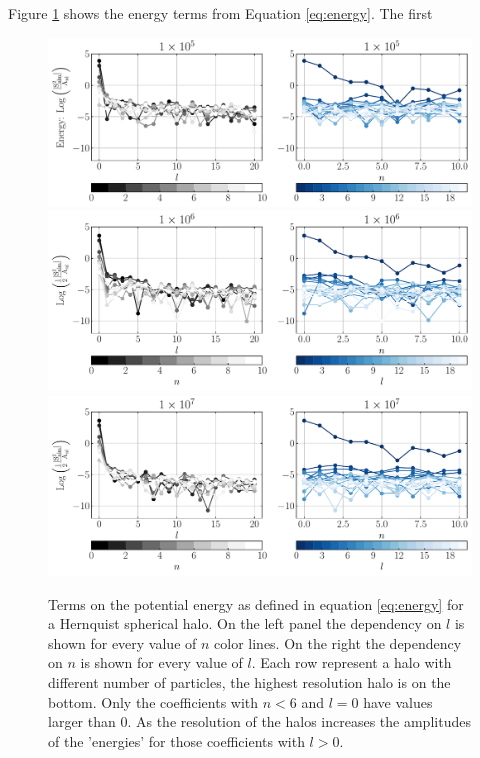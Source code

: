 \documentclass[14pt]{article}
\begin{document}
Figure \ref{fig:spherical_energy} shows the energy terms from Equation
\ref{eq:energy}. The first 

\begin{figure}[H]
  \centering
  \includegraphics[scale=0.5]{../code/energy_terms_hern_a_40_1E5.pdf}
  \includegraphics[scale=0.5]{../code/energy_terms_hern_a_40_1E6.pdf}
  \includegraphics[scale=0.5]{../code/energy_terms_hern_a_40_1E7.pdf}
  \caption{Terms on the potential energy as defined in equation 
  \ref{eq:energy} for a Hernquist spherical halo. On the left panel the dependency on $l$ is shown for every value of $n$ color lines. 
On the right the dependency on $n$ is shown for every value of $l$. Each row represent a halo with different number of particles, the highest resolution halo is on the bottom. Only the coefficients 
with $n<6$ and $l=0$ have values larger than 0. As the resolution of the halos increases the amplitudes 
of the 'energies' for those coefficients with $l>0$.}\label{fig:spherical_energy}
\end{figure}
\end{document}
